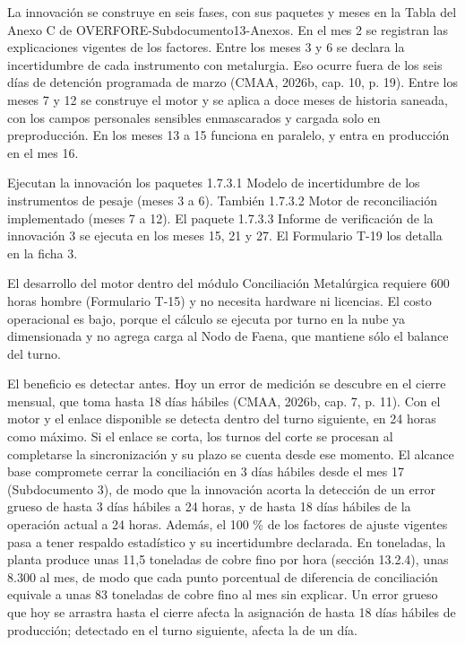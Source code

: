 \documentclass[subdoc]{../../comun/overfore}
\begin{document}
La innovación se construye en seis fases, con sus paquetes y meses en la Tabla  del Anexo C de OVERFORE-Subdocumento13-Anexos. En el mes 2 se registran las explicaciones vigentes de los factores. Entre los meses 3 y 6 se declara la incertidumbre de cada instrumento con metalurgia. Eso ocurre fuera de los seis días de detención programada de marzo (CMAA, 2026b, cap. 10, p. 19). Entre los meses 7 y 12 se construye el motor y se aplica a doce meses de historia saneada, con los campos personales sensibles enmascarados y cargada solo en preproducción. En los meses 13 a 15 funciona en paralelo, y entra en producción en el mes 16.

Ejecutan la innovación los paquetes 1.7.3.1 Modelo de incertidumbre de los instrumentos de pesaje (meses 3 a 6). También 1.7.3.2 Motor de reconciliación implementado (meses 7 a 12). El paquete 1.7.3.3 Informe de verificación de la innovación 3 se ejecuta en los meses 15, 21 y 27. El Formulario T-19 los detalla en la ficha 3.

El desarrollo del motor dentro del módulo Conciliación Metalúrgica requiere 600 horas hombre (Formulario T-15) y no necesita hardware ni licencias. El costo operacional es bajo, porque el cálculo se ejecuta por turno en la nube ya dimensionada y no agrega carga al Nodo de Faena, que mantiene sólo el balance del turno.

El beneficio es detectar antes. Hoy un error de medición se descubre en el cierre mensual, que toma hasta 18 días hábiles (CMAA, 2026b, cap. 7, p. 11). Con el motor y el enlace disponible se detecta dentro del turno siguiente, en 24 horas como máximo. Si el enlace se corta, los turnos del corte se procesan al completarse la sincronización y su plazo se cuenta desde ese momento. El alcance base compromete cerrar la conciliación en 3 días hábiles desde el mes 17 (Subdocumento 3), de modo que la innovación acorta la detección de un error grueso de hasta 3 días hábiles a 24 horas, y de hasta 18 días hábiles de la operación actual a 24 horas. Además, el 100 \% de los factores de ajuste vigentes pasa a tener respaldo estadístico y su incertidumbre declarada. En toneladas, la planta produce unas 11,5 toneladas de cobre fino por hora (sección 13.2.4), unas 8.300 al mes, de modo que cada punto porcentual de diferencia de conciliación equivale a unas 83 toneladas de cobre fino al mes sin explicar. Un error grueso que hoy se arrastra hasta el cierre afecta la asignación de hasta 18 días hábiles de producción; detectado en el turno siguiente, afecta la de un día.
\end{document}
